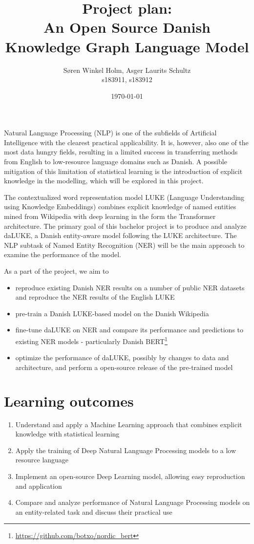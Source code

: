 \documentclass[12pt,fleqn]{article}
\title{
    Project plan:\\
    An Open Source Danish Knowledge Graph Language Model
}
\author{Søren Winkel Holm, Asger Laurits Schultz\\s183911, s183912}
\date{\today}
\begin{document}
\maketitle\noindent
Natural Language Processing (NLP) is one of the subfields of Artificial Intelligence with the clearest practical applicability.
It is, however, also one of the most data hungry fields, resulting in a limited success in transferring methods from English to low-resource language domains such as Danish.
A possible mitigation of this limitation of statistical learning is the introduction of explicit knowledge in the modelling, which will be explored in this project.

The contextualized word representation model LUKE (Language Understanding using Knowledge Embeddings) \cite{luke} combines explicit knowledge of named entities mined from Wikipedia with deep learning in the form the Transformer architecture. \cite{transformer}
The primary goal of this bachelor project is to produce and analyze daLUKE, a Danish entity-aware model following the LUKE architecture.
The NLP subtask of Named Entity Recognition (NER) will be the main approach to examine the performance of the model.

As a part of the project, we aim to
\begin{itemize}
    \item reproduce existing Danish NER results on a number of public NER datasets and reproduce the NER results of the English LUKE
    \item pre-train a Danish LUKE-based model on the Danish Wikipedia
    \item fine-tune daLUKE on NER and compare its performance and predictions to existing NER models - particularly Danish BERT\footnote{\url{https://github.com/botxo/nordic\_bert}}
    \item optimize the performance of daLUKE, possibly by changes to data and architecture, and perform a open-source release of the pre-trained model
\end{itemize}

\section*{Learning outcomes}%
\begin{enumerate}
    \item Understand and apply a Machine Learning approach that combines explicit knowledge with statistical learning
    \item Apply the training of Deep Natural Language Processing models to a low resource language
    \item Implement an open-source Deep Learning model, allowing easy reproduction and application
    \item Compare and analyze performance of Natural Language Processing models on an entity-related task and discuss their practical use
\end{enumerate}
\end{document}
